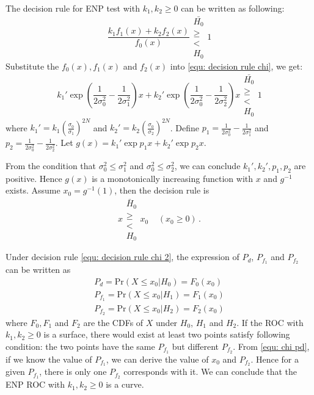 \documentclass[12pt,journal,a4paper,twoside,onecolumn]{IEEEtran}
\begin{document}
\begin{spacing}{2.5}
The decision rule for ENP test with $k_1, k_2 \geq 0$ can be written as following:
\begin{equation}
\label{equ: decision rule chi}
  \frac{k_1f_1(x) + k_2f_2(x)}{f_0(x)} \substack{\bar{H_0} \\ \geq \\ < \\ H_0} 1
\end{equation}
Substitute the $f_0(x), f_1(x)$ and $f_2(x)$ into \eqref{equ: decision rule chi}, we get:
\begin{equation}
  \label{equ: decision rule chi 1}
  k_1'\exp{(\frac{1}{2\sigma_0^2} - \frac{1}{2\sigma_1^2})x} + k_2'\exp{(\frac{1}{2\sigma_0^2} - \frac{1}{2\sigma_2^2})x} \substack{\bar{H_0} \\ \geq \\ < \\ H_0} 1
\end{equation}
where $k_1' = k_1(\frac{\sigma_0}{\sigma_1})^{2N}$ and $k_2' = k_2(\frac{\sigma_0}{\sigma_2})^{2N}$. Define $p_1 = \frac{1}{2\sigma_0^2} - \frac{1}{2\sigma_1^2}$ and $p_2 = \frac{1}{2\sigma_0^2} - \frac{1}{2\sigma_2^2}$. Let $g(x) =  k_1'\exp{p_1x}+k_2'\exp{p_2x}$.

From the condition that $\sigma_0^2 \leq \sigma_1^2$ and $\sigma_0^2 \leq \sigma_2^2$,  we can conclude $k_1', k_2', p_1, p_2$ are positive. Hence $g(x)$ is a monotonically increasing function with $x$ and $g^{-1}$ exists. Assume $x_0 = g^{-1}(1)$, then the decision rule is
\begin{equation}
  \label{equ: decision rule chi 2}
  x \substack{\bar{H}_0 \\ \geq \\ < \\ H_0} x_0\;\;\;\;(x_0 \geq 0)\,.
\end{equation}

Under decision rule \eqref{equ: decision rule chi 2}, the expression of $P_d$, $P_{f_1}$ and $P_{f_2}$ can be written as
\begin{equation}
\label{equ: chi pd}
  \begin{split}
    P_d = \text{Pr}(X \leq x_0 | H_0) = F_0(x_0)\\
        P_{f_1} = \text{Pr}(X \leq x_0 | H_1) = F_1(x_0)\\
            P_{f_2} = \text{Pr}(X \leq x_0 | H_2) = F_2(x_0)
  \end{split}
\end{equation}
where $F_0, F_1$ and  $F_2$  are the CDFs of $X$ under $H_0$, $H_1$ and $H_2$.
If the ROC with $k_1, k_2 \geq 0$ is a surface, there would exist at least two points satisfy following condition: the two points have the same $P_{f_1}$ but different $P_{f_2}$.
From \eqref{equ: chi pd}, if we know the value of $P_{f_1}$,  we can derive the value of $x_0$ and $P_{f_2}$. Hence for a given $P_{f_1}$, there is only one $P_{f_2}$ corresponds with it. We can conclude that the ENP ROC with $k_1, k_2 \geq 0$ is a curve.


\end{spacing}
\end{document}
